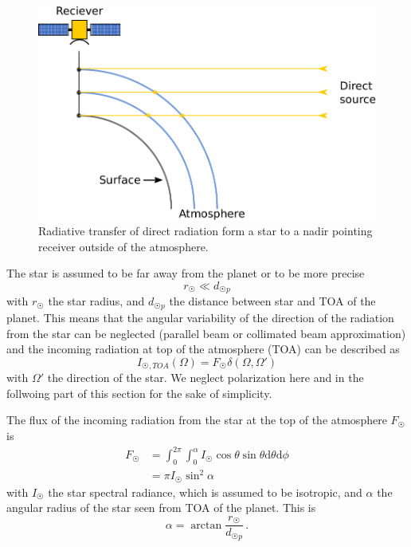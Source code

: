 \begin{figure}[t]
 \begin{center}
   \includegraphics*[width=0.6\hsize]{star_reciever_geometry}
   \caption{Radiative transfer of direct radiation form a star to
   a nadir pointing receiver outside of the atmosphere.  }
  \label{fig:rtetheory:star_receiver_geometry}
 \end{center}
\end{figure}

 The star is assumed to be far away from the planet or to be more precise
 \begin{equation}
  r_{\astrosun}\ll d_{\astrosun p}
 \end{equation} 
 with $r_{\astrosun}$ the star radius,
 and $d_{\astrosun p}$ the distance between star and TOA of the planet. 
 This means that the angular variability of the direction of the  radiation 
 from the star can be neglected (parallel beam or collimated  beam approximation) 
 and the incoming radiation at top of  the atmosphere (TOA) can be described as 
 \begin{equation}
 I_{\astrosun,TOA}\left(\Omega\right)=F_{\astrosun}\delta\left(\Omega,\Omega'\right)\label{eq:rtetheory:directsource}
 \end{equation}
 with $\Omega'$ the direction of the star. We neglect polarization here and in the follwoing part of this section for 
 the sake of simplicity. 

The flux of the incoming radiation from the star at the top of the atmosphere
$F_{\astrosun}$ is
\begin{align}
	F_{\astrosun} &=
		\int^{2\pi}_0 \int^{\alpha}_0 I_{\astrosun}\cos\theta\sin\theta
		\text{d}\theta\text{d}\phi\nonumber\\
		&=\pi I_{\astrosun}\sin^{2}\alpha
\end{align}
with $I_{\astrosun}$ the star spectral radiance, which is assumed
to be isotropic, and $\alpha$ the angular radius of the star seen
from TOA of the planet. This is 
\begin{equation}
	\alpha=\arctan\frac{r_{\astrosun}}{d_{\astrosun p}}\,.
\end{equation}

